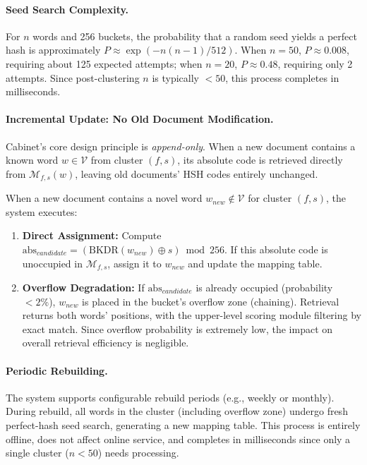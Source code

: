 \documentclass[11pt,a4paper]{article}
\theoremstyle{definition}
\begin{document}
\paragraph{Seed Search Complexity.} For $n$ words and 256 buckets, the probability that a random seed yields a perfect hash is approximately $P \approx \exp(-n(n-1)/512)$. When $n = 50$, $P \approx 0.008$, requiring about 125 expected attempts; when $n = 20$, $P \approx 0.48$, requiring only 2 attempts. Since post-clustering $n$ is typically $< 50$, this process completes in milliseconds.

\paragraph{Incremental Update: No Old Document Modification.} Cabinet's core design principle is \emph{append-only}. When a new document contains a known word $w \in \mathcal{V}$ from cluster $(f, s)$, its absolute code is retrieved directly from $\mathcal{M}_{f,s}(w)$, leaving old documents' HSH codes entirely unchanged.

When a new document contains a novel word $w_{new} \notin \mathcal{V}$ for cluster $(f, s)$, the system executes:

\begin{enumerate}
    \item \textbf{Direct Assignment:} Compute $\text{abs}_{candidate} = (\text{BKDR}(w_{new}) \oplus s) \bmod 256$. If this absolute code is unoccupied in $\mathcal{M}_{f,s}$, assign it to $w_{new}$ and update the mapping table.
    \item \textbf{Overflow Degradation:} If $\text{abs}_{candidate}$ is already occupied (probability $< 2\%$), $w_{new}$ is placed in the bucket's overflow zone (chaining). Retrieval returns both words' positions, with the upper-level scoring module filtering by exact match. Since overflow probability is extremely low, the impact on overall retrieval efficiency is negligible.
\end{enumerate}

\paragraph{Periodic Rebuilding.} The system supports configurable rebuild periods (e.g., weekly or monthly). During rebuild, all words in the cluster (including overflow zone) undergo fresh perfect-hash seed search, generating a new mapping table. This process is entirely offline, does not affect online service, and completes in milliseconds since only a single cluster ($n < 50$) needs processing.
\end{document}
